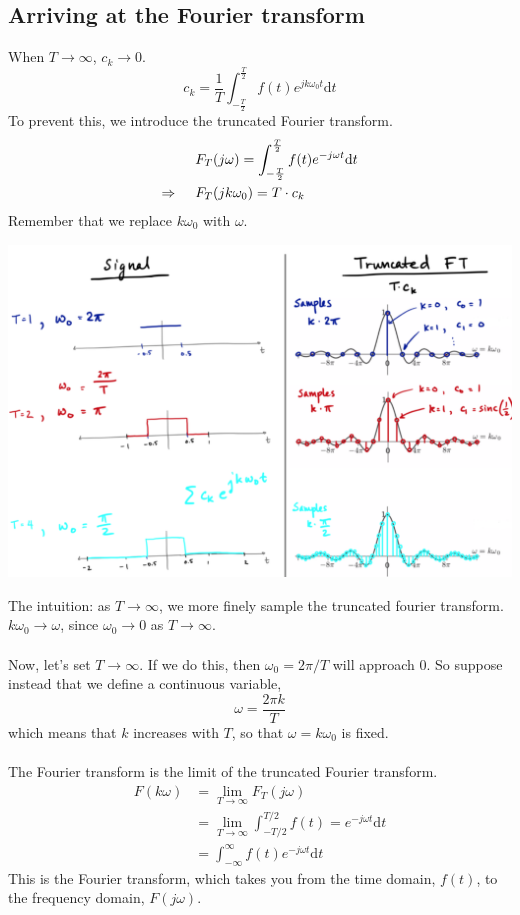 \documentclass[10pt]{article}
\begin{document}
\subsection*{Arriving at the Fourier transform}
When $T \rightarrow \infty$, $c_k \rightarrow 0$.
\[c_k = \frac{1}{T} \int_{-\frac{T}{2}}^{\frac{T}{2}} f(t) e^{jk\omega_0 t} \text{d}t\]
To prevent this, we introduce the truncated Fourier transform.
\begin{align*}
    &F_T(j\omega) = \int_{-\frac{T}{2}}^{\frac{T}{2}} f(t) e^{-j\omega t} \text{d}t\\
    \Rightarrow \hspace{0.5cm} & F_T(jk\omega_0) = T \cdot c_k
\end{align*}
Remember that we replace $k\omega_0$ with $\omega$.
\begin{center}
    \includegraphics[scale=0.68]{W5_2.png}
\end{center}
The intuition: as $T \rightarrow \infty$, we more finely sample the truncated fourier transform.  $k\omega_0 \rightarrow \omega$, since $\omega_0 \rightarrow 0$ as $T \rightarrow \infty$.\\\\
Now, let's set $T \rightarrow \infty$.  If we do this, then $\omega_0 = 2\pi / T$ will approach 0.  So suppose instead that we define a continuous variable,
\[\omega = \frac{2\pi k}{T}\]
which means that $k$ increases with $T$, so that $\omega = k\omega_0$ is fixed.\\\\
The Fourier transform is the limit of the truncated Fourier transform.
\begin{align*}
    F(k\omega) &= \lim_{T \rightarrow \infty} F_T(j\omega)\\
    &= \lim_{T \rightarrow \infty} \int_{-T/2}^{T/2} f(t) = e^{-j\omega t} \text{d}t\\
    &= \int_{-\infty}^\infty f(t) e^{-j\omega t} \text{d}t
\end{align*}
This is the Fourier transform, which takes you from the time domain, $f(t)$, to the frequency domain, $F(j\omega)$.
\end{document}
